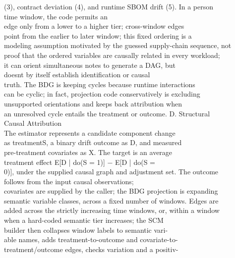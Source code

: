 \documentclass[conference]{IEEEtran}
\begin{document}
(3), contract deviation (4), and runtime SBOM drift (5). In a person\\
time window, the code permits an\\
edge only from a lower to a higher tier; cross-window edges\\
point from the earlier to later window; this fixed ordering is a\\
modeling assumption motivated by the guessed supply-chain sequence, not\\
proof that the ordered variables are causally related in every workload;\\
it can orient simultaneous notes to generate a DAG, but\\
doesn\textquotesingle t by itself establish identification or causal\\
truth. The BDG is keeping cycles because runtime interactions\\
can be cyclic; in fact, projection code conservatively is excluding\\
unsupported orientations and keeps back attribution when\\
an unresolved cycle entails the treatment or outcome. D. Structural\\
Causal Attribution\\
The estimator represents a candidate component change\\
as treatmentS, a binary drift outcome as D, and measured\\
pre-treatment covariates as X. The target is an average\\
treatment effect E{[}D |{} do(S = 1){]} − E{[}D |{} do(S =\\
0){]}, under the supplied causal graph and adjustment set. The outcome\\
follows from the input causal observations;\\
covariates are supplied by the caller; the BDG projection is expanding\\
semantic variable classes, across a fixed number of windows. Edges are\\
added across the strictly increasing time windows, or, within a window\\
when a hard-coded semantic tier increases; the SCM\\
builder then collapses window labels to semantic vari-\\
able names, adds treatment-to-outcome and covariate-to-\\
treatment/outcome edges, checks variation and a positiv-\\
\end{document}
